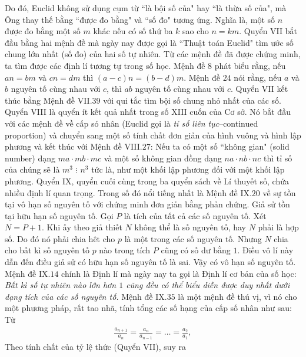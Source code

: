 \begin{multicols}{2}
	\vskip 0.1cm
	Do đó, Euclid không sử dụng cụm từ ``là bội số của" hay ``là thừa số của", mà Ông thay thế bằng ``được đo bằng" và ``số đo" tương ứng. Nghĩa là, một số $n$  được đo bằng một số $m$  khác nếu có số thứ ba $k$  sao cho  $n = km$.
	\vskip 0.1cm
	Quyển VII bắt đầu bằng hai mệnh đề mà ngày nay được gọi là ``Thuật toán Euclid" tìm ước số chung lớn nhất (số đo) của hai số tự nhiên.
	\vskip 0.1cm
	Từ các mệnh đề đã được chứng minh, ta tìm được các định lí tương tự trong số học. Mệnh đề $8$ phát biểu rằng, nếu $an = bm$  và $cn = dm$ thì  $(a-c)n = (b-d)m$.  Mệnh đề $24$ nói rằng, nếu $a$ và $b$  nguyên tố cùng nhau với $c$,  thì  $ab$ nguyên tố cùng nhau với $c$.  Quyển VII kết thúc bằng Mệnh đề VII.$39$ với qui tắc tìm bội số chung nhỏ nhất của các số.
	\vskip 0.1cm
	Quyển VIII là quyển ít kết quả nhất trong số XIII cuốn của Cơ sở. Nó bắt đầu với các mệnh đề về cấp só nhân (Euclid gọi là \textit{tỉ số liên tục}--continued proportion) và chuyển sang một số tính chất đơn giản của hình vuông và hình lập phương và kết thúc với Mệnh đề VIII.$27$: Nếu ta có một số ``không gian" (solid number) dạng $ma \cdot mb \cdot mc$  và một số không gian đồng dạng  $na \cdot nb \cdot nc$ thì tỉ số của chúng sẽ là  $m^3 \,\,\vdots \,\, n^3$ tức là, như một khối lập phương đối với một khối lập phương.
	\vskip 0.1cm
	Quyển IX, quyển cuối cùng trong ba quyển sách về Lí thuyết số, chứa nhiều định lí quan trọng. Trong số đó nổi tiếng nhất là Mệnh đề IX.$20$ về sự tồn tại vô hạn số nguyên tố với chứng minh đơn giản bằng phản chứng. Giả sử tồn tại hữu hạn số nguyên tố. Gọi $P$ là tích của tất cả các số nguyên tố. Xét $N = P + 1$.  Khi ấy theo giả thiết $N$  không thể là số nguyên tố, hay $N$  phải là hợp số. Do đó nó phải chia hêt cho $p$  là một trong các số nguyên tố. Nhưng $N$  chia cho bất kì số nguyên tố $p$  nào trong tích  $P$ cũng có số dư bằng $1$. Điều vô lí này dẫn đến điều giả sử có hữu hạn số nguyên tố là sai. Vậy có vô hạn số nguyên tố. Mệnh đề IX.$14$ chính là Định lí mà ngày nay ta gọi là Định lí cơ bản của số học: \textit{Bất kì số tự nhiên nào lớn hơn $1$ cũng đều có thể biểu diễn được duy nhất dưới dạng tích của các số nguyên tố.}
	\vskip 0.1cm  
	Mệnh đề IX.$35$ là một mệnh đề thú vị, vì nó cho một phương pháp, rất tao nhã, tính tổng các số hạng của cấp số nhân như sau: Từ
	\begin{align*}
		\frac{a_{n+1}}{a_n} = \frac{a_n}{a_{n-1}} = \ldots= \frac{a_2}{a_1},
	\end{align*}
	Theo tính chất của tỷ lệ thức (Quyển VII), suy ra
	\begin{align*}

\end{align*}
\end{multicols}
